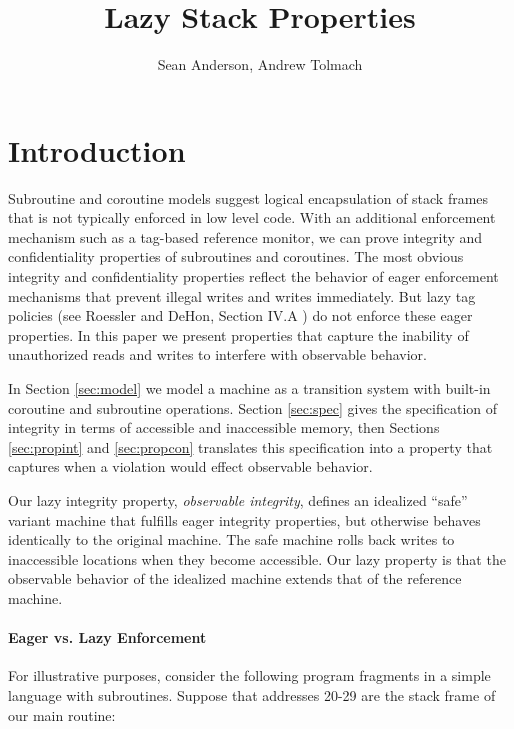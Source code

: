 \documentclass{article}
\title{Lazy Stack Properties}
\author{Sean Anderson, Andrew Tolmach}
\begin{document}
  \maketitle

  \section{Introduction}

    Subroutine and coroutine models suggest logical encapsulation of stack frames that is not typically
    enforced in low level code. With an additional enforcement mechanism such as a tag-based reference monitor,
    we can prove integrity and confidentiality properties of subroutines and coroutines.
    The most obvious integrity and confidentiality properties reflect the behavior of eager enforcement mechanisms
    that prevent illegal writes and writes immediately. But lazy tag policies (see Roessler and DeHon, Section IV.A
    \cite{Roessler2018ProtectingHardware}) do not enforce these eager properties.
    In this paper we present properties that capture the inability of unauthorized reads and writes
    to interfere with observable behavior.

    In Section \ref{sec:model} we model a machine as a transition system with built-in coroutine and subroutine
    operations. Section \ref{sec:spec} gives the specification of integrity in terms of accessible and inaccessible
    memory, then Sections \ref{sec:propint} and \ref{sec:propcon} translates this specification into a property
    that captures when a violation would effect observable behavior.

    Our lazy integrity property, {\it observable integrity}, defines an idealized ``safe'' variant machine that fulfills
    eager integrity properties, but otherwise behaves identically to the original machine. The safe machine rolls
    back writes to inaccessible locations when they become accessible. Our lazy property is that the observable
    behavior of the idealized machine extends that of the reference machine.

    \paragraph{Eager vs. Lazy Enforcement}

      For illustrative purposes, consider the following program fragments in a simple language with subroutines.
      Suppose that addresses 20-29 are the stack frame of our main routine:
\end{document}
